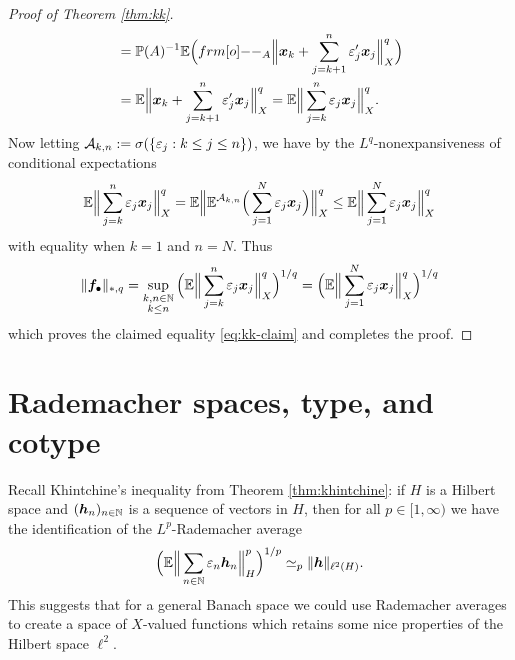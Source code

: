 \begin{proof}[Proof of Theorem \ref{thm:kk}]
\begin{equation*}
\begin{aligned}
      &=  \P(A)^{-1} \E \Big( \1_{A} \Big\|\mb{x}_k + \sum_{j=k+1}^{n} \varepsilon_{j}^{\prime} \mb{x}_j \Big\|_{X}^{q} \Big) \\
      &=  \E \Big\|\mb{x}_k + \sum_{j=k+1}^{n} \varepsilon_{j}^{\prime} \mb{x}_j \Big\|_{X}^{q} 
      =  \E  \Big\|\sum_{j=k}^{n} \varepsilon_{j} \mb{x}_j \Big\|_{X}^{q}. \\
    \end{aligned}
  \end{equation*}
  Now letting $\mathcal{A}_{k,n} := \sigma(\{\varepsilon_j : k \leq j \leq n\})$, we have by the $L^q$-nonexpansiveness of conditional expectations
  \begin{equation*}
    \mathbb{E} \Big\|\sum_{j=k}^{n} \varepsilon_{j} \bm{x}_j \Big\|_{X}^{q}
    = \mathbb{E} \Big\|\mathbb{E}^{\mathcal{A}_{k,n}} \Big(\sum_{j=1}^{N} \varepsilon_{j} \bm{x}_j \Big)\Big\|_{X}^{q}
    \leq \mathbb{E} \Big\|\sum_{j=1}^{N} \varepsilon_{j} \bm{x}_j \Big\|_{X}^{q}
  \end{equation*}
  with equality when $k=1$ and $n=N$.
  Thus
  \begin{equation*}
    \|\bm{f}_{\bullet}\|_{*,q} =  \sup_{\substack{k,n \in \mathbb{N} \\ k \leq n}}  \Big(\mathbb{E}  \Big\|\sum_{j=k}^{n} \varepsilon_{j} \bm{x}_j \Big\|_{X}^{q}\Big)^{1/q} = \Big(\mathbb{E}  \Big\|\sum_{j=1}^{N} \varepsilon_{j} \bm{x}_j \Big\|_{X}^{q}\Big)^{1/q}
  \end{equation*}
  which proves the claimed equality \eqref{eq:kk-claim} and completes the proof. 
\end{proof}

\section{Rademacher spaces, type, and cotype}\label{sec:rademacher-spaces}

Recall Khintchine's inequality from Theorem \ref{thm:khintchine}: if $H$ is a Hilbert space and $(\bm{h}_{n})_{n \in \mathbb{N}}$ is a sequence of vectors in $H$, then for all $p \in [1,\infty)$ we have the identification of the $L^p$-Rademacher average
\begin{equation*}
  \Big( \mathbb{E} \Big\| \sum_{n \in \mathbb{N}} \varepsilon_{n} \bm{h}_{n} \Big\|_{H}^{p} \Big)^{1/p} \simeq_{p} \|\bm{h}\|_{\ell^2(H)}.
\end{equation*}
This suggests that for a general Banach space we could use Rademacher averages to create a space of $X$-valued functions which retains some nice properties of the Hilbert space $\ell^2$.

